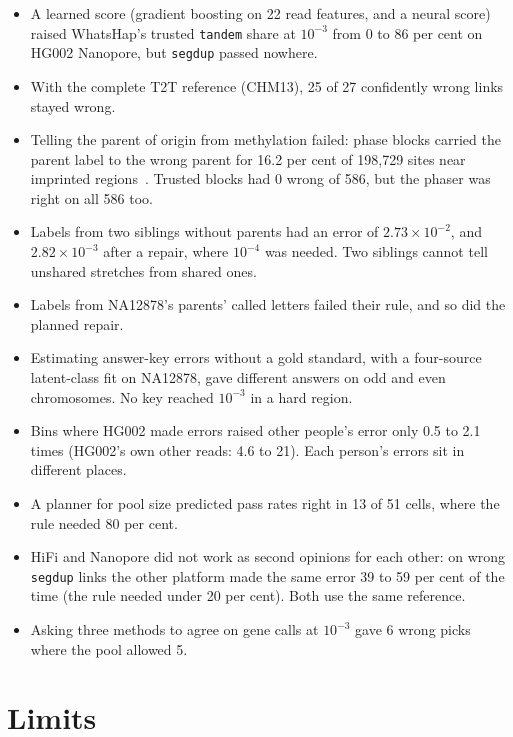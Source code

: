 \documentclass[11pt]{article}
\newcommand{\grp}[1]{\texttt{#1}}
\begin{document}
\begin{itemize}
\item A learned score (gradient boosting on 22 read features, and a neural
  score) raised WhatsHap's trusted \grp{tandem} share at $10^{-3}$ from 0 to
  86 per cent on HG002 Nanopore, but \grp{segdup} passed nowhere.
\item With the complete T2T reference (CHM13), 25 of 27 confidently wrong
  links stayed wrong.
\item Telling the parent of origin from methylation failed: phase blocks
  carried the parent label to the wrong parent for 16.2 per cent of 198{,}729
  sites near imprinted regions~\cite{akbari2022}. Trusted blocks had 0 wrong
  of 586, but the phaser was right on all 586 too.
\item Labels from two siblings without parents had an error of
  $2.73\times10^{-2}$, and $2.82\times10^{-3}$ after a repair, where
  $10^{-4}$ was needed. Two siblings cannot tell unshared stretches from
  shared ones.
\item Labels from NA12878's parents' called letters failed their rule, and so
  did the planned repair.
\item Estimating answer-key errors without a gold standard, with a
  four-source latent-class fit on NA12878, gave different answers on odd and
  even chromosomes. No key reached $10^{-3}$ in a hard region.
\item Bins where HG002 made errors raised other people's error only 0.5 to
  2.1 times (HG002's own other reads: 4.6 to 21). Each person's errors sit
  in different places.
\item A planner for pool size predicted pass rates right in 13 of 51 cells,
  where the rule needed 80 per cent.
\item HiFi and Nanopore did not work as second opinions for each other: on
  wrong \grp{segdup} links the other platform made the same error 39 to 59
  per cent of the time (the rule needed under 20 per cent). Both use the
  same reference.
\item Asking three methods to agree on gene calls at $10^{-3}$ gave 6 wrong
  picks where the pool allowed 5.
\end{itemize}


\section{Limits}\label{sec:limits}
\end{document}
